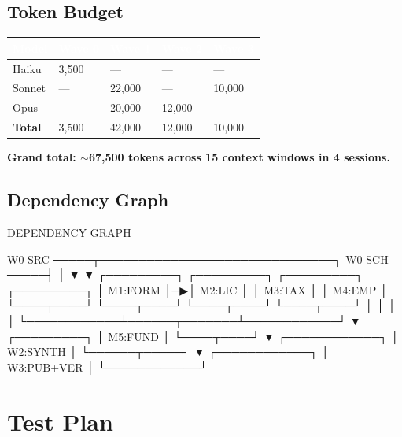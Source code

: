 \documentclass[11pt,letterpaper]{article}
\newcommand{\tableheader}[1]{\textbf{\sffamily\textcolor{white}{#1}}}
\begin{document}
\subsection{Token Budget}

\begin{center}
\begin{tabularx}{\textwidth}{L{3.5cm}C{2cm}C{2cm}C{2cm}C{2cm}}
\toprule
{}
\tableheader{Model} & \tableheader{Wave 0} & \tableheader{Wave 1} & \tableheader{Wave 2} & \tableheader{Wave 3} \\
\midrule
Haiku & 3,500 & --- & --- & --- \\
Sonnet & --- & 22,000 & --- & 10,000 \\
Opus & --- & 20,000 & 12,000 & --- \\
\midrule
\textbf{Total} & 3,500 & 42,000 & 12,000 & 10,000 \\
\bottomrule
\end{tabularx}
\end{center}

\textbf{Grand total: $\sim$67,500 tokens across 15 context windows in 4 sessions.}

\subsection{Dependency Graph}

\begin{asciibox}
  DEPENDENCY GRAPH

  W0-SRC ─────┬──────────────────────────────┐
  W0-SCH ─────┤                              │
              ▼                              ▼
        ┌─────────┐  ┌─────────┐    ┌─────────┐  ┌─────────┐
        │ M1:FORM │─▶│ M2:LIC  │    │ M3:TAX  │  │ M4:EMP  │
        └────┬────┘  └────┬────┘    └────┬────┘  └────┬────┘
             │            │              │            │
             └────────────┴──────┬───────┴────────────┘
                                 ▼
                          ┌─────────┐
                          │ M5:FUND │
                          └────┬────┘
                               ▼
                        ┌────────────┐
                        │ W2:SYNTH   │
                        └──────┬─────┘
                               ▼
                        ┌────────────┐
                        │ W3:PUB+VER │
                        └────────────┘
\end{asciibox}

\section{Test Plan}
\end{document}
